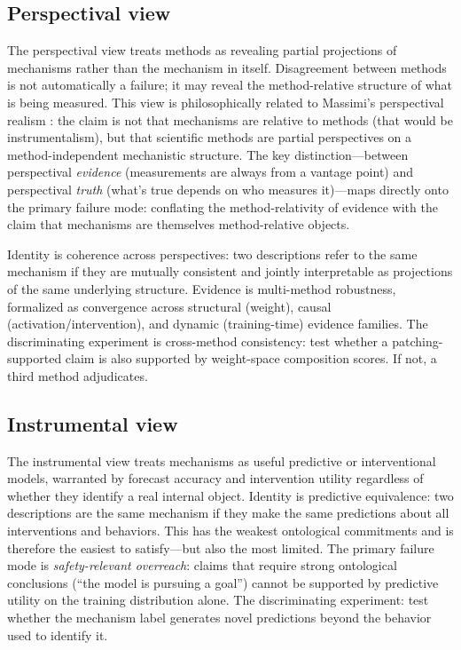 \documentclass{article}
\begin{document}
\subsection{Perspectival view}

The perspectival view treats methods as revealing partial projections of
mechanisms rather than the mechanism in itself.  Disagreement between
methods is not automatically a failure; it may reveal the method-relative
structure of what is being measured.  This view is philosophically related
to Massimi's perspectival realism \citep{massimi2022}: the claim is not
that mechanisms are relative to methods (that would be instrumentalism),
but that scientific methods are partial perspectives on a
method-independent mechanistic structure.  The key distinction---between
perspectival \emph{evidence} (measurements are always from a vantage
point) and perspectival \emph{truth} (what's true depends on who measures
it)---maps directly onto the primary failure mode: conflating the
method-relativity of evidence with the claim that mechanisms are
themselves method-relative objects.

Identity is coherence across perspectives: two descriptions refer to the
same mechanism if they are mutually consistent and jointly interpretable
as projections of the same underlying structure.  Evidence is
multi-method robustness, formalized as
convergence across structural (weight), causal (activation/intervention),
and dynamic (training-time) evidence families.  The discriminating
experiment is cross-method consistency: test whether a patching-supported
claim is also supported by weight-space composition scores.  If not,
a third method adjudicates.

\subsection{Instrumental view}

The instrumental view treats mechanisms as useful predictive or
interventional models, warranted by forecast accuracy and intervention
utility regardless of whether they identify a real internal object.
Identity is predictive equivalence: two descriptions are the same
mechanism if they make the same predictions about all interventions and
behaviors.  This has the weakest ontological commitments and is therefore
the easiest to satisfy---but also the most limited.  The primary failure
mode is \emph{safety-relevant overreach}: claims that require strong
ontological conclusions (``the model is pursuing a goal'') cannot be
supported by predictive utility on the training distribution alone.
The discriminating experiment: test whether the mechanism label generates
novel predictions beyond the behavior used to identify it.
\end{document}
